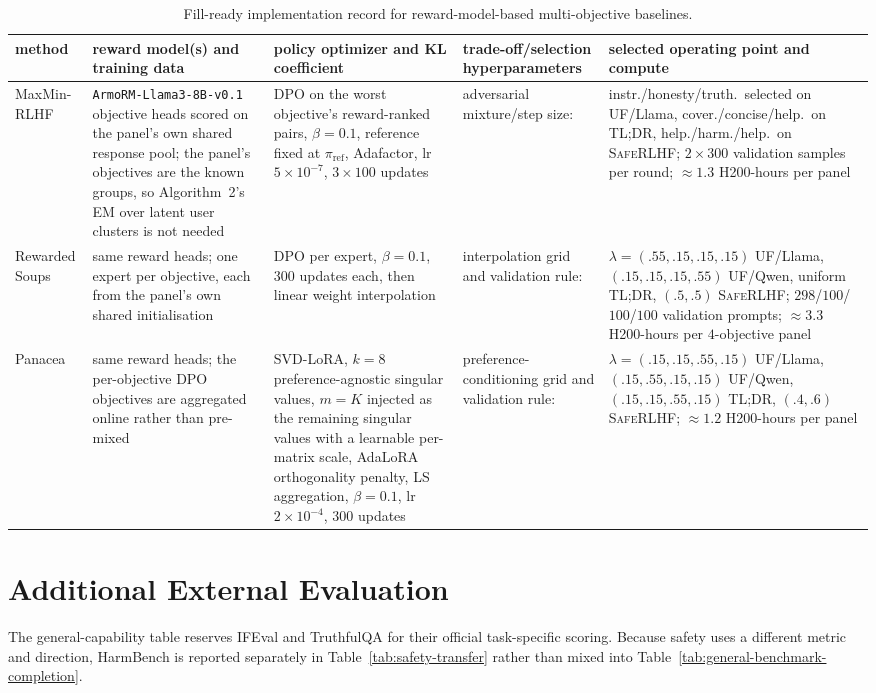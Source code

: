 \documentclass{article}
\theoremstyle{remark}
\theoremstyle{plain}
\newcommand{\piref}{\pi_{\mathrm{ref}}}
\begin{document}
\begin{table}[t]
\centering\scriptsize
\setlength{\tabcolsep}{1.6pt}
\caption{Fill-ready implementation record for reward-model-based multi-objective baselines.}
\label{tab:rm-baseline-protocol}
\begin{tabular}{p{2.4cm}p{2.9cm}p{2.5cm}p{2.5cm}p{2.8cm}}
\toprule
method & reward model(s) and training data & policy optimizer and KL coefficient & trade-off/selection hyperparameters & selected operating point and compute\\
\midrule
MaxMin-RLHF & \texttt{ArmoRM-\allowbreak Llama3-\allowbreak 8B-\allowbreak v0.1} objective heads scored on the panel's own shared response pool; the panel's objectives are the known groups, so Algorithm~2's EM over latent user clusters is not needed & DPO on the worst objective's reward-ranked pairs, $\beta=0.1$, reference fixed at $\piref$, Adafactor, lr $5\times10^{-7}$, $3\times100$ updates & adversarial mixture/step size: & instr./honesty/truth.\ selected on \textsc{UF}/Llama, cover./concise/help.\ on \textsc{TL;DR}, help./harm./help.\ on \textsc{SafeRLHF}; $2\times300$ validation samples per round; ${\approx}1.3$ H200-hours per panel \\
Rewarded Soups & same reward heads; one expert per objective, each from the panel's own shared initialisation & DPO per expert, $\beta=0.1$, $300$ updates each, then linear weight interpolation & interpolation grid and validation rule: & $\lambda=(.55,.15,.15,.15)$ \textsc{UF}/Llama, $(.15,.15,.15,.55)$ \textsc{UF}/Qwen, uniform \textsc{TL;DR}, $(.5,.5)$ \textsc{SafeRLHF}; $298$/$100$/$100$/$100$ validation prompts; ${\approx}3.3$ H200-hours per $4$-objective panel \\
Panacea & same reward heads; the per-objective DPO objectives are aggregated online rather than pre-mixed & SVD-LoRA, $k=8$ preference-agnostic singular values, $m=K$ injected as the remaining singular values with a learnable per-matrix scale, AdaLoRA orthogonality penalty, LS aggregation, $\beta=0.1$, lr $2\times10^{-4}$, $300$ updates & preference-conditioning grid and validation rule: & $\lambda=(.15,.15,.55,.15)$ \textsc{UF}/Llama, $(.15,.55,.15,.15)$ \textsc{UF}/Qwen, $(.15,.15,.55,.15)$ \textsc{TL;DR}, $(.4,.6)$ \textsc{SafeRLHF}; ${\approx}1.2$ H200-hours per panel \\
\bottomrule
\end{tabular}
\end{table}

\section{Additional External Evaluation}
\label{app:external-evaluation}
The general-capability table reserves IFEval and TruthfulQA for their official
task-specific scoring. Because safety uses a different metric and direction,
HarmBench is reported separately in Table~\ref{tab:safety-transfer} rather than
mixed into Table~\ref{tab:general-benchmark-completion}.
\end{document}
